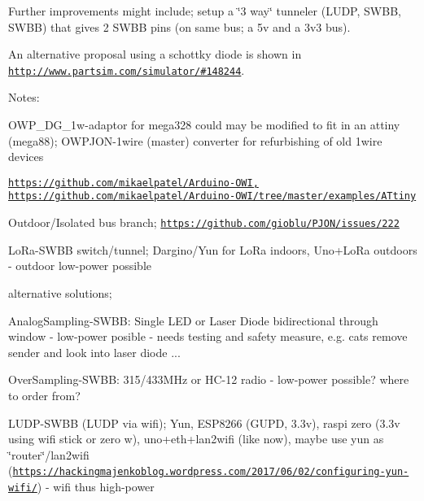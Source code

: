 Further improvements might include; setup a \char`\"{}3 way\char`\"{} tunneler (L\-U\-D\-P, S\-W\-B\-B, S\-W\-B\-B) that gives 2 S\-W\-B\-B pins (on same bus; a 5v and a 3v3 bus).

An alternative proposal using a schottky diode is shown in \href{http://www.partsim.com/simulator/#148244}{\tt http\-://www.\-partsim.\-com/simulator/\#148244}.

Notes\-:
\begin{DoxyItemize}
\item O\-W\-P\-\_\-\-D\-G\-\_\-1w-\/adaptor for mega328 could may be modified to fit in an attiny (mega88); O\-W\-P\-J\-O\-N-\/1wire (master) converter for refurbishing of old 1wire devices
\begin{DoxyItemize}
\item \href{https://github.com/mikaelpatel/Arduino-OWI,}{\tt https\-://github.\-com/mikaelpatel/\-Arduino-\/\-O\-W\-I,} \href{https://github.com/mikaelpatel/Arduino-OWI/tree/master/examples/ATtiny}{\tt https\-://github.\-com/mikaelpatel/\-Arduino-\/\-O\-W\-I/tree/master/examples/\-A\-Ttiny}
\end{DoxyItemize}
\item Outdoor/\-Isolated bus branch; \href{https://github.com/gioblu/PJON/issues/222}{\tt https\-://github.\-com/gioblu/\-P\-J\-O\-N/issues/222}
\begin{DoxyItemize}
\item Lo\-Ra-\/\-S\-W\-B\-B switch/tunnel; Dargino/\-Yun for Lo\-Ra indoors, Uno+\-Lo\-Ra outdoors -\/ outdoor low-\/power possible
\item alternative solutions;
\begin{DoxyItemize}
\item Analog\-Sampling-\/\-S\-W\-B\-B\-: Single L\-E\-D or Laser Diode bidirectional through window -\/ low-\/power posible -\/ needs testing and safety measure, e.\-g. cats remove sender and look into laser diode ...
\item Over\-Sampling-\/\-S\-W\-B\-B\-: 315/433\-M\-Hz or H\-C-\/12 radio -\/ low-\/power possible? where to order from?
\item L\-U\-D\-P-\/\-S\-W\-B\-B (L\-U\-D\-P via wifi); Yun, E\-S\-P8266 (G\-U\-P\-D, 3.\-3v), raspi zero (3.\-3v using wifi stick or zero w), uno+eth+lan2wifi (like now), maybe use yun as \char`\"{}router\char`\"{}/lan2wifi (\href{https://hackingmajenkoblog.wordpress.com/2017/06/02/configuring-yun-wifi/}{\tt https\-://hackingmajenkoblog.\-wordpress.\-com/2017/06/02/configuring-\/yun-\/wifi/}) -\/ wifi thus high-\/power
\end{DoxyItemize}

\end{DoxyItemize}
\end{DoxyItemize}

